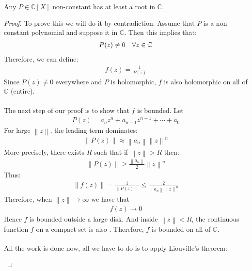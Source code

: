 \begin{theoreme}
	Any $P \in \mathbb{C}\left[X\right]$ non-constant has at least a root in $\mathbb{C}$.
\end{theoreme}
\begin{proof}
    To prove this we will do it by contradiction. Assume that $P$ is a non-constant polynomial and suppose it  in $\mathbb{C}$. Then this implies that:
	\begin{align*} 
		P\left(z\right) \neq 0 \mathspace \forall z \in \mathbb{C}
	\end{align*}
	Therefore, we can define:
	\begin{align*} 
		f\left(z\right) = \frac{1}{P\left(z\right)}
	\end{align*}
	Since $P\left(z\right) \neq 0$ everywhere and $P$ is holomorphic, $f$ is also holomorphic on all of $\mathbb{C}$ (entire).\\
	$ $\\
	The next step of our proof is to show that $f$ is bounded. Let 
	\begin{align*} 
		P\left(z\right) = a_nz^{n} + a_{n-1}z^{n-1} + \cdots + a_0
	\end{align*}
	For large $\left\| z\right\|$, the leading term dominates:
	\begin{align*} 
		\left\|P\left(z\right)\right\|  \approx \left\|a_n\right\|\left\|z\right\|^{n}
	\end{align*}
	More precisely, there exists $R$ such that if $\left\|z\right\| > R$ then:
	\begin{align*} \left\|P\left(z\right)\right\| \geq \frac{\left\|a_n\right\|}{2}\left\|z\right\|^{n} \end{align*}
	Thus:
	\begin{align*} 
		\left\|f\left(z\right)\right\| =  \frac{1}{\left\|P\left(z\right)\right\|} \leq \frac{2}{\left\|a_n\right\|\left\|z\right\|^{n}}
	\end{align*}
	Therefore, when $\left\|z\right\| \to \infty$ we have that
	\begin{align*} 
		f\left(z\right) \to 0
	\end{align*}
	Hence $f$ is bounded outside a large disk. And inside $\left\|z\right\| < R$, the continuous function $f$ on a compact set is also . Therefore, $f$ is bounded on all of $\mathbb{C}$.\\
	$ $\\
	All the work is done now, all we have to do is to apply Liouville's theorem:
	\begin{theoreme}

\end{theoreme}
\end{proof}
